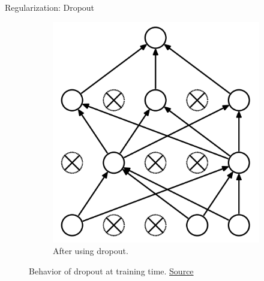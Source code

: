 \begin{frame}{Regularization: Dropout}
\begin{figure}[H]
\begin{subfigure}[b]{0.3\textwidth}
	\includegraphics[width=\textwidth]{Images/Dropout-after.png}
	\caption{After using dropout.}
	\label{fig:Dropout-after}
\end{subfigure}
\caption{Behavior of dropout at training time. \href{https://www.cs.toronto.edu/~hinton/absps/JMLRdropout.pdf}{Source}}
\end{figure}
\end{frame}

